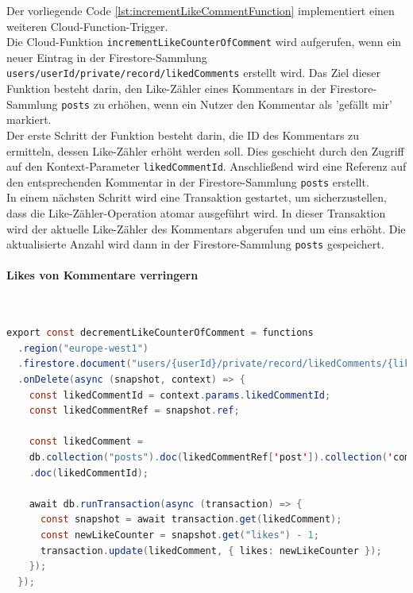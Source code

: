 Der vorliegende Code \ref{lst:incrementLikeCommentFunction} implementiert einen weiteren Cloud-Function-Trigger.
\\
Die Cloud-Funktion \texttt{incrementLikeCounterOfComment} wird aufgerufen, wenn ein neuer Eintrag in der Firestore-Sammlung \texttt{users/{userId}/private/record/likedComments} erstellt wird. Das Ziel dieser Funktion besteht darin, den Like-Zähler eines Kommentars in der Firestore-Sammlung \texttt{posts} zu erhöhen, wenn ein Nutzer den Kommentar als 'gefällt mir' markiert.
\\
Der erste Schritt der Funktion besteht darin, die ID des Kommentars zu ermitteln, dessen Like-Zähler erhöht werden soll. Dies geschieht durch den Zugriff auf den Kontext-Parameter \texttt{likedCommentId}. Anschließend wird eine Referenz auf den entsprechenden Kommentar in der Firestore-Sammlung \texttt{posts} erstellt.
\\
In einem nächsten Schritt wird eine Transaktion gestartet, um sicherzustellen, dass die Like-Zähler-Operation atomar ausgeführt wird. In dieser Transaktion wird der aktuelle Like-Zähler des Kommentars abgerufen und um eins erhöht. Die aktualisierte Anzahl wird dann in der Firestore-Sammlung \texttt{posts} gespeichert.

\paragraph{Likes von Kommentare verringern}\mbox{} \\

\begin{lstlisting}[language=Java,caption=decrementLikeCounterOfComment Funktion,label=lst:decrementLikeCommentFunction]
  export const decrementLikeCounterOfComment = functions
  .region("europe-west1")
  .firestore.document("users/{userId}/private/record/likedComments/{likedCommentId}")
  .onDelete(async (snapshot, context) => {
    const likedCommentId = context.params.likedCommentId;
    const likedCommentRef = snapshot.ref;

    const likedComment =
    db.collection("posts").doc(likedCommentRef['post']).collection('comments')
    .doc(likedCommentId);

    await db.runTransaction(async (transaction) => {
      const snapshot = await transaction.get(likedComment);
      const newLikeCounter = snapshot.get("likes") - 1;
      transaction.update(likedComment, { likes: newLikeCounter });
    });
  });
\end{lstlisting}

